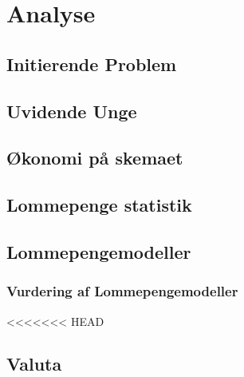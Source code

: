 





\tableofcontents

\chapter{Analyse}

\section{Initierende Problem}


\section{Uvidende Unge}
\label{UvidendeUnge}


\section{Økonomi på skemaet}
\label{Okonomi}


\section{Lommepenge statistik}
\label{LommeStat}


\section{Lommepengemodeller}
\label{LommeModeller}

\subsection{Vurdering af Lommepengemodeller}
\label{ModelVurdering}


<<<<<<< HEAD
\section{Valuta}
\label{Valuta}




